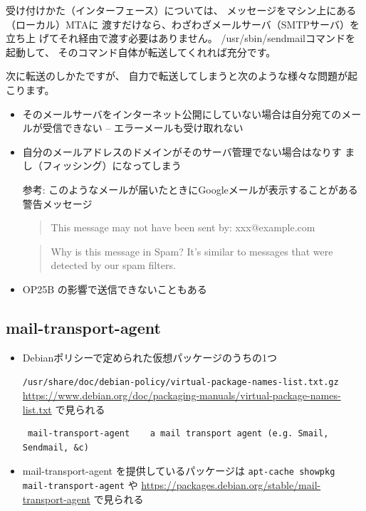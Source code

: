 \documentclass[mingoth,a4paper]{jsarticle}
\begin{document}
 受け付けかた（インターフェース）については、
 メッセージをマシン上にある（ローカル）MTAに
	       渡すだけなら、わざわざメールサーバ（SMTPサーバ）を立ち上
 げてそれ経由で渡す必要はありません。
 /usr/sbin/sendmailコマンドを起動して、
 そのコマンド自体が転送してくれれば充分です。


次に転送のしかたですが、
 自力で転送してしまうと次のような様々な問題が起こります。
 
 \begin{itemize}
  \item そのメールサーバをインターネット公開にしていない場合は自分宛てのメー
	ルが受信できない -- エラーメールも受け取れない
  
  \item 自分のメールアドレスのドメインがそのサーバ管理でない場合はなりす
	まし（フィッシング）になってしまう

参考: このようなメールが届いたときにGoogleメールが表示することがある警告メッセージ
	\begin{quote}
This message may not have been sent by: xxx@example.com
	\end{quote}
\begin{quote}
Why is this message in Spam? It's similar to messages that were detected by our spam filters.
\end{quote}
  
  \item OP25B の影響で送信できないこともある
 \end{itemize}



\subsection{mail-transport-agent}


\begin{itemize}
 \item Debianポリシーで定められた仮想パッケージのうちの1つ

 \verb|/usr/share/doc/debian-policy/virtual-package-names-list.txt.gz|
 \url{https://www.debian.org/doc/packaging-manuals/virtual-package-names-list.txt}
 で見られる

\begin{verbatim}
 mail-transport-agent    a mail transport agent (e.g. Smail, Sendmail, &c)
\end{verbatim}

 \item 
 mail-transport-agent を提供しているパッケージは
 \verb|apt-cache showpkg mail-transport-agent|
 や
 \url{https://packages.debian.org/stable/mail-transport-agent}
 で見られる
\end{itemize}
\end{document}
